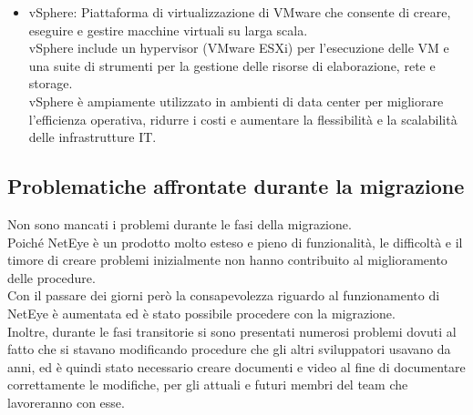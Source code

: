 \begin{itemize}
  \item vSphere: Piattaforma di virtualizzazione di VMware che consente di
    creare, eseguire e gestire macchine virtuali su larga scala.\\ vSphere include
    un hypervisor (VMware ESXi) per l'esecuzione delle VM e una suite di strumenti
    per la gestione delle risorse di elaborazione, rete e storage.\\ vSphere è
    ampiamente utilizzato in ambienti di data center per migliorare l'efficienza
    operativa, ridurre i costi e aumentare la flessibilità e la scalabilità delle
    infrastrutture IT.
\end{itemize}

\subsection{Problematiche affrontate durante la migrazione}
\label{sub:problemi}

Non sono mancati i problemi durante le fasi della migrazione.\\ Poiché NetEye è un
prodotto molto esteso e pieno di funzionalità, le difficoltà e il timore di
creare problemi inizialmente non hanno contribuito al miglioramento delle
procedure.\\ Con il passare dei giorni però la consapevolezza riguardo al
funzionamento di NetEye è aumentata ed è stato possibile procedere con la
migrazione.\\ Inoltre, durante le fasi transitorie si sono presentati numerosi problemi
dovuti al fatto che si stavano modificando procedure che gli altri sviluppatori usavano
da anni, ed è quindi stato necessario creare documenti e video al fine di
documentare correttamente le modifiche, per gli attuali e futuri membri del team
che lavoreranno con esse.